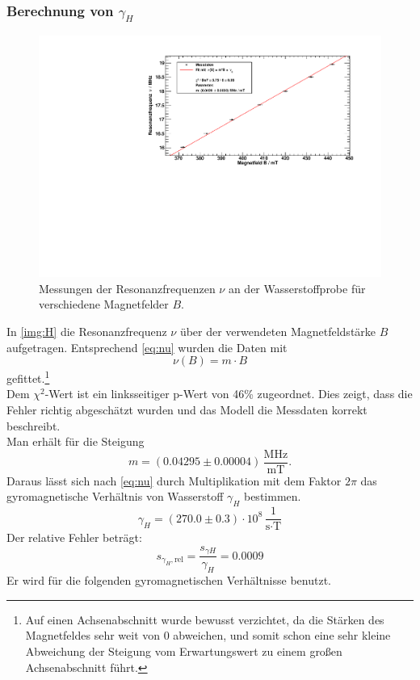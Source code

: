 \subsubsection{Berechnung von $\gamma_H$}
\begin{figure}[H]
\begin{center}
  \includegraphics[width=\textwidth]{../img/03-H.pdf}
  \caption{Messungen der Resonanzfrequenzen $\nu$ an der Wasserstoffprobe für verschiedene Magnetfelder $B$.}
  \label{img:H}
\end{center}
\end{figure}
In \autoref{img:H} die Resonanzfrequenz $\nu$ über der verwendeten Magnetfeldstärke $B$ aufgetragen. Entsprechend \autoref{eq:nu} wurden 
die Daten mit 
\begin{equation}
  \nu(B) = m \cdot B
\end{equation}
gefittet.\footnote{Auf einen Achsenabschnitt wurde bewusst verzichtet, da die Stärken des Magnetfeldes sehr weit von 0 abweichen, und somit schon 
eine sehr kleine Abweichung der Steigung vom Erwartungswert zu einem großen Achsenabschnitt führt.} \\
Dem $\chi^2$-Wert ist ein linksseitiger p-Wert von 46\% zugeordnet. Dies zeigt, dass die Fehler richtig abgeschätzt wurden und das Modell 
die Messdaten korrekt beschreibt. \\
Man erhält für die Steigung
\begin{equation}
  m = (0.04295 \pm 0.00004)\,\frac{\text{MHz}}{\text{mT}}.
\end{equation}
Daraus lässt sich nach \autoref{eq:nu} durch Multiplikation mit dem Faktor $2 \pi$ das gyromagnetische Verhältnis von Wasserstoff $\gamma_H$ bestimmen. 
\begin{equation}
  \gamma_H = (270.0 \pm 0.3) \cdot 10^8\,\frac{1}{\text{s} \cdot \text{T}}
\end{equation}
Der relative Fehler beträgt:
\begin{equation}
  s_{\gamma_{H}, \text{rel}} = \frac{s_{\gamma H}}{\gamma_H} = 0.0009
\end{equation}
Er wird für die folgenden gyromagnetischen Verhältnisse benutzt.

